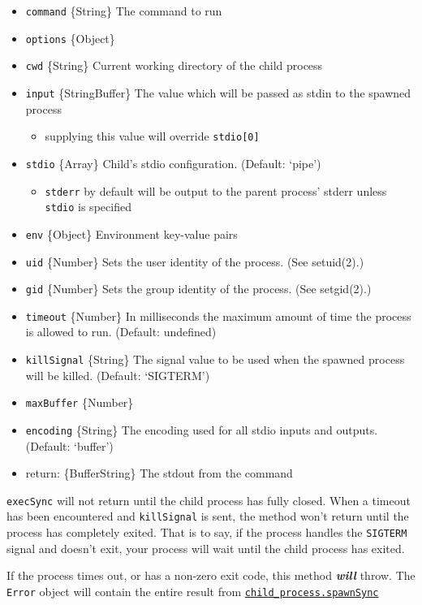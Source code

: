 \begin{itemize}
\itemsep1pt\parskip0pt
\item
  \texttt{command} \{String\} The command to run
\item
  \texttt{options} \{Object\}
\item
  \texttt{cwd} \{String\} Current working directory of the child process
\item
  \texttt{input} \{String\textbar{}Buffer\} The value which will be
  passed as stdin to the spawned process

  \begin{itemize}
  \itemsep1pt\parskip0pt
  \item
    supplying this value will override \texttt{stdio{[}0{]}}
  \end{itemize}
\item
  \texttt{stdio} \{Array\} Child's stdio configuration. (Default:
  `pipe')

  \begin{itemize}
  \itemsep1pt\parskip0pt
  \item
    \texttt{stderr} by default will be output to the parent process'
    stderr unless \texttt{stdio} is specified
  \end{itemize}
\item
  \texttt{env} \{Object\} Environment key-value pairs
\item
  \texttt{uid} \{Number\} Sets the user identity of the process. (See
  setuid(2).)
\item
  \texttt{gid} \{Number\} Sets the group identity of the process. (See
  setgid(2).)
\item
  \texttt{timeout} \{Number\} In milliseconds the maximum amount of time
  the process is allowed to run. (Default: undefined)
\item
  \texttt{killSignal} \{String\} The signal value to be used when the
  spawned process will be killed. (Default: `SIGTERM')
\item
  \texttt{maxBuffer} \{Number\}
\item
  \texttt{encoding} \{String\} The encoding used for all stdio inputs
  and outputs. (Default: `buffer')
\item
  return: \{Buffer\textbar{}String\} The stdout from the command
\end{itemize}

\texttt{execSync} will not return until the child process has fully
closed. When a timeout has been encountered and \texttt{killSignal} is
sent, the method won't return until the process has completely exited.
That is to say, if the process handles the \texttt{SIGTERM} signal and
doesn't exit, your process will wait until the child process has exited.

If the process times out, or has a non-zero exit code, this method
\textbf{\emph{will}} throw. The \texttt{Error} object will contain the
entire result from
\hyperref[childux5fprocessux5fchildux5fprocessux5fspawnsyncux5fcommandux5fargsux5foptions]{\texttt{child\_process.spawnSync}}
